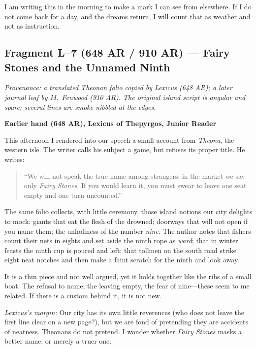 \documentclass[11pt]{article}
\begin{document}
I am writing this in the morning to make a mark I can see from elsewhere. If I do not come back for a day, and the dreams return, I will count that as weather and not as instruction.

\subsection*{Fragment L--7 (648 AR / 910 AR) --- Fairy Stones and the Unnamed Ninth}
\label{frag:l7}
{}

\noindent\textit{Provenance: a translated Theonan folio copied by Lexicus (648 AR); a later journal leaf by M.\ Fenwood (910 AR). The original island script is angular and spare; several lines are smoke-nibbled at the edges.}

\medskip
\noindent\textbf{Earlier hand (648 AR), Lexicus of Thepyrgos, Junior Reader}

This afternoon I rendered into our speech a small account from \textit{Theona}, the western isle. The writer calls his subject a game, but refuses its proper title. He writes:

\begin{quote}\small
``We will not speak the true name among strangers; in the market we say only \emph{Fairy Stones}. If you would learn it, you must swear to leave one seat empty and one turn uncounted.'' 
\end{quote}

The same folio collects, with little ceremony, those island notions our city delights to mock: giants that eat the flesh of the drowned; doorways that will not open if you name them; the unholiness of the number \textit{nine}. The author notes that fishers count their nets in eights and set aside the ninth rope as \emph{ward}; that in winter feasts the ninth cup is poured and left; that tollmen on the south road strike eight neat notches and then make a faint scratch for the ninth and look away.

It is a thin piece and not well argued, yet it holds together like the ribs of a small boat. The refusal to name, the leaving empty, the fear of nine---these seem to me related. If there is a custom behind it, it is not new.

\medskip
\noindent\textit{Lexicus’s margin:} Our city has its own little reverences (who does not leave the first line clear on a new page?), but we are fond of pretending they are accidents of neatness. Theonans do not pretend. I wonder whether \emph{Fairy Stones} masks a better name, or merely a truer one.
\end{document}

